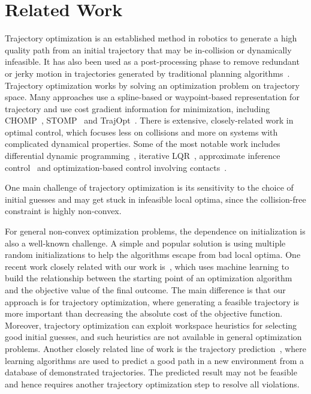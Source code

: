 \documentclass[letterpaper, 10 pt, conference]{ieeeconf}  %
\begin{document}
\section{Related Work}
\label{sec:related}
Trajectory optimization is an established method in robotics to generate a high quality path from an initial trajectory that may be in-collision or dynamically infeasible. It has also been used as a post-processing phase to remove redundant or jerky motion in trajectories generated by traditional planning algorithms~\cite{Latombe:1991:RMP,Lavalle:2006:PA}. Trajectory optimization works by solving an optimization problem on trajectory space. Many approaches use a spline-based or waypoint-based representation for trajectory and use cost gradient information for minimization, including CHOMP~\cite{Ratliff:2009:CGO}, STOMP~\cite{Kalakrishnan:2011:STOMP} and TrajOpt~\cite{Schulman:2013:FLO}. There is extensive, closely-related work in optimal control, which focuses less on collisions and more on systems with complicated dynamical properties. Some of the most notable work includes differential dynamic programming~\cite{Jacobson:1970:DDP,Atkeson:1994:ULT}, iterative LQR~\cite{Todorvo:2005:iLQG}, approximate inference control~\cite{Toussaint:2009:RTO} and optimization-based control involving contacts~\cite{Mordatch:2012:DCB,Tassa:2012:SSC,Erez:2012:TOD,Posa:2013:DTO}. 

One main challenge of trajectory optimization is its sensitivity to the choice of initial guesses and may get stuck in infeasible local optima, since the collision-free constraint is highly non-convex.

For general non-convex optimization problems, the dependence on initialization is also a well-known challenge. A simple and popular solution is using multiple random initializations to help the algorithms escape from bad local optima. 
One recent work closely related with our work is~\cite{Cassioli:2012:MLG}, which uses machine learning to build the relationship between the starting point of an optimization algorithm and the objective value of the final outcome. The main difference is that our approach is for trajectory optimization, where generating a feasible trajectory is more important than decreasing the absolute cost of the objective function. Moreover, trajectory optimization can exploit workspace heuristics for selecting good initial guesses, and such heuristics are not available in general optimization problems. Another closely related line of work is the trajectory prediction~\cite{Jetchev:2013:FMP}, where learning algorithms are used to predict a good path in a new environment from a database of demonstrated trajectories. The predicted result may not be feasible and hence requires another trajectory optimization step to resolve all violations.
\end{document}
